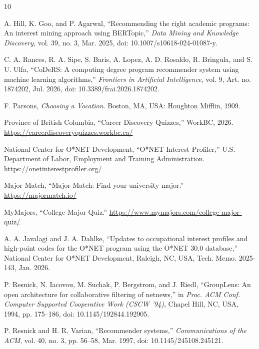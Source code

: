 \documentclass[sigconf]{acmart}
\begin{document}
\begin{thebibliography}{10}

A. Hill, K. Goo, and P. Agarwal, ``Recommending the right academic programs: An interest mining approach using BERTopic,'' \textit{Data Mining and Knowledge Discovery}, vol. 39, no. 3, Mar. 2025, doi: 10.1007/s10618-024-01087-y.

C. A. Rances, R. A. Sipe, S. Baris, A. Lopez, A. D. Rosaldo, R. Bringula, and S. U. Ulfa, ``CoDeRS: A computing degree program recommender system using machine learning algorithms,'' \textit{Frontiers in Artificial Intelligence}, vol. 9, Art. no. 1874202, Jul. 2026, doi: 10.3389/frai.2026.1874202.

F. Parsons, \textit{Choosing a Vocation}. Boston, MA, USA: Houghton Mifflin, 1909.

Province of British Columbia, ``Career Discovery Quizzes,'' WorkBC, 2026. \url{https://careerdiscoveryquizzes.workbc.ca/}

National Center for O*NET Development, ``O*NET Interest Profiler,'' U.S. Department of Labor, Employment and Training Administration. \url{https://onetinterestprofiler.org/}

Major Match, ``Major Match: Find your university major.'' \url{https://majormatch.io/}

MyMajors, ``College Major Quiz.'' \url{https://www.mymajors.com/college-major-quiz/}

A. A. Javalagi and J. A. Dahlke, ``Updates to occupational interest profiles and high-point codes for the O*NET program using the O*NET 30.0 database,'' National Center for O*NET Development, Raleigh, NC, USA, Tech. Memo. 2025-143, Jan. 2026.

P. Resnick, N. Iacovou, M. Suchak, P. Bergstrom, and J. Riedl, ``GroupLens: An open architecture for collaborative filtering of netnews,'' in \textit{Proc. ACM Conf. Computer Supported Cooperative Work (CSCW '94)}, Chapel Hill, NC, USA, 1994, pp. 175--186, doi: 10.1145/192844.192905.

P. Resnick and H. R. Varian, ``Recommender systems,'' \textit{Communications of the ACM}, vol. 40, no. 3, pp. 56--58, Mar. 1997, doi: 10.1145/245108.245121.

\end{thebibliography}
\end{document}
